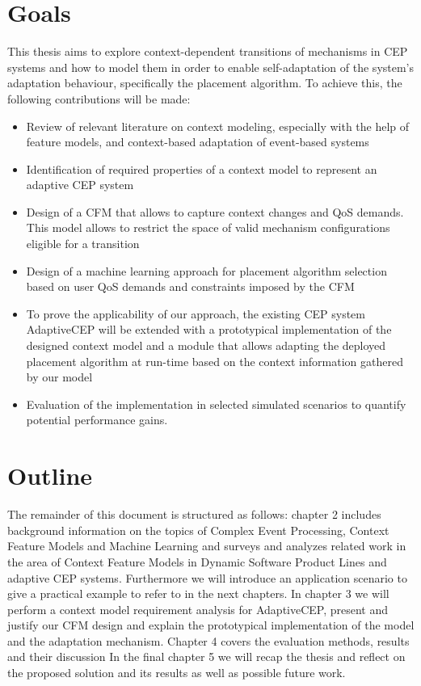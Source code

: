 \section{Goals}
This thesis aims to explore context-dependent transitions of mechanisms in CEP systems and how to model them in order to enable self-adaptation of the system's adaptation behaviour, specifically the placement algorithm. 
To achieve this, the following contributions will be made:
\begin{itemize}
\item Review of relevant literature on context modeling, especially with the help of feature models, and context-based adaptation of event-based systems
\item Identification of required properties of a context model to represent an adaptive CEP system
\item Design of a CFM that allows to capture context changes and QoS demands. This model allows to restrict the space of valid mechanism configurations eligible for a transition
\item Design of a machine learning approach for placement algorithm selection based on user QoS demands and constraints imposed by the CFM
\item To prove the applicability of our approach, the existing CEP system AdaptiveCEP will be extended with a prototypical implementation of the designed context model and a module that allows adapting the deployed placement algorithm at run-time based on the context information gathered by our model
\item Evaluation of the implementation in selected simulated scenarios to quantify potential performance gains.
\end{itemize} 


\section{Outline}
The remainder of this document is structured as follows: 
chapter 2 includes background information on the topics of Complex Event Processing, Context Feature Models and Machine Learning and surveys and analyzes related work in the area of Context Feature Models in Dynamic Software Product Lines and adaptive CEP systems. Furthermore we will introduce an application scenario to give a practical example to refer to in the next chapters.
 In chapter 3 we will perform a context model requirement analysis for AdaptiveCEP, present and justify our CFM design and explain the prototypical implementation of the model and the adaptation mechanism.
 Chapter 4 covers the evaluation methods, results and their discussion
 In the final chapter 5 we will recap the thesis and reflect on the proposed solution and its results as well as possible future work.



